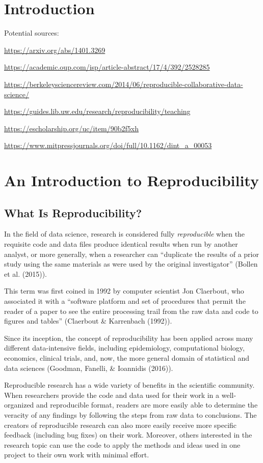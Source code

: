 \documentclass[12pt,twoside]{reedthesis}
\begin{document}
\chapter*{Introduction}\label{introduction}

Potential sources:

\url{https://arxiv.org/abs/1401.3269}

\url{https://academic.oup.com/isp/article-abstract/17/4/392/2528285}

\url{https://berkeleysciencereview.com/2014/06/reproducible-collaborative-data-science/}

\url{https://guides.lib.uw.edu/research/reproducibility/teaching}

\url{https://escholarship.org/uc/item/90b2f5xh}

\url{https://www.mitpressjournals.org/doi/full/10.1162/dint_a_00053}

\chapter{An Introduction to Reproducibility}\label{reproducibility}

\section{What Is Reproducibility?}\label{what-is-reproducibility}

In the field of data science, research is considered fully
\emph{reproducible} when the requisite code and data files produce
identical results when run by another analyst, or more generally, when a
researcher can ``duplicate the results of a prior study using the same
materials as were used by the original investigator'' (Bollen et al.
(2015)).

This term was first coined in 1992 by computer scientist Jon Claerbout,
who associated it with a ``software platform and set of procedures that
permit the reader of a paper to see the entire processing trail from the
raw data and code to figures and tables'' (Claerbout \& Karrenbach
(1992)).

Since its inception, the concept of reproducibility has been applied
across many different data-intensive fields, including epidemiology,
computational biology, economics, clinical trials, and, now, the more
general domain of statistical and data sciences (Goodman, Fanelli, \&
Ioannidis (2016)).

Reproducible research has a wide variety of benefits in the scientific
community. When researchers provide the code and data used for their
work in a well-organized and reproducible format, readers are more
easily able to determine the veracity of any findings by following the
steps from raw data to conclusions. The creators of reproducible
research can also more easily receive more specific feedback (including
bug fixes) on their work. Moreover, others interested in the research
topic can use the code to apply the methods and ideas used in one
project to their own work with minimal effort.
\end{document}
